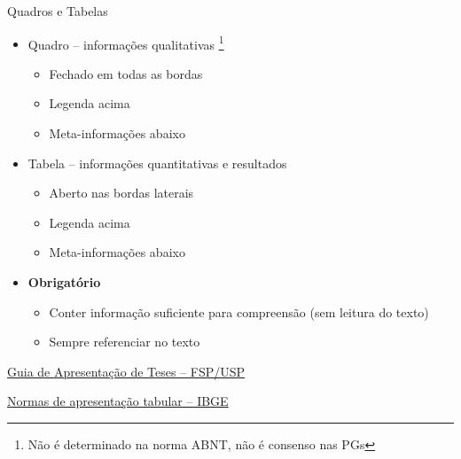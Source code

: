 \documentclass{beamer}
\begin{document}
\begin{frame}{Quadros e Tabelas}
  \begin{itemize}
    \footnotesize
  \item Quadro -- informações qualitativas
    \footnote{\scriptsize Não é determinado na norma ABNT, não é consenso nas PGs}
    \begin{itemize}
      \scriptsize
    \item Fechado em todas as bordas
    \item Legenda acima
    \item Meta-informações abaixo
    \end{itemize}
    \bigskip
  \item Tabela -- informações quantitativas e resultados
    \begin{itemize}
      \scriptsize
    \item Aberto nas bordas laterais
    \item Legenda acima
    \item Meta-informações abaixo
    \end{itemize}
    \bigskip
  \item \alert{\bf Obrigatório}
    \begin{itemize}
      \scriptsize
    \item Conter informação suficiente para compreensão ({\tiny sem leitura do texto})
    \item Sempre referenciar no texto
    \end{itemize}
  \end{itemize}

  \vfill
  \scriptsize
  \hfill \href{http://www.biblioteca.fsp.usp.br/~biblioteca/guia/i_cap_04.htm}
  {Guia de Apresentação de Teses -- FSP/USP}

  \hfill \href{https://biblioteca.ibge.gov.br/index.php/biblioteca-catalogo?view=detalhes&id=223907}
  {Normas de apresentação tabular -- IBGE}
\end{frame}
\end{document}
